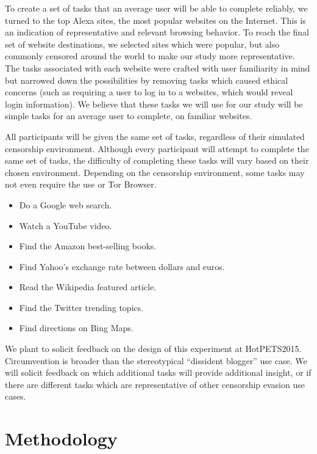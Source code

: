 \documentclass[letterpaper,twocolumn,11pt]{article}
\begin{document}
To create a set of tasks that an average user will be able to complete reliably, 
we turned to the top Alexa sites, the most popular websites on the Internet. This 
is an indication of representative and relevant browsing behavior. To reach the final
set of website destinations, we selected sites which were popular, but also commonly
censored around the world to make our study more representative. The tasks 
associated with each website were crafted with user familiarity in mind but narrowed 
down the possibilities by removing tasks which caused ethical concerns (such as 
requiring a user to log in to a websites, which would reveal login information).  
We believe that these tasks we will use for our study will be simple tasks for an average 
user to complete, on familiar websites. 

All participants will be given the same set of tasks, regardless of their simulated
censorship environment.  Although every participant will attempt to complete the same 
set of tasks, the difficulty of completing these tasks will vary based on their chosen environment. 
Depending on the censorship environment, some tasks may not even require the use or Tor Browser. 

\begin{itemize} \itemsep1pt \parskip0pt 
\item Do a Google web search.
\item Watch a YouTube video.
\item Find the Amazon best-selling books.
\item Find Yahoo's exchange rate between dollars and euros.
\item Read the Wikipedia featured article.
\item Find the Twitter trending topics.
\item Find directions on Bing Maps.
\end{itemize}


We plant to solicit feedback on the design of this experiment at HotPETS2015. 
Circumvention is broader than the stereotypical ``dissident blogger'' 
use case. We will solicit feedback on which additional tasks will provide additional insight,
or if there are different tasks which are representative of other censorship evasion use cases.

\section{Methodology}  
\end{document}
